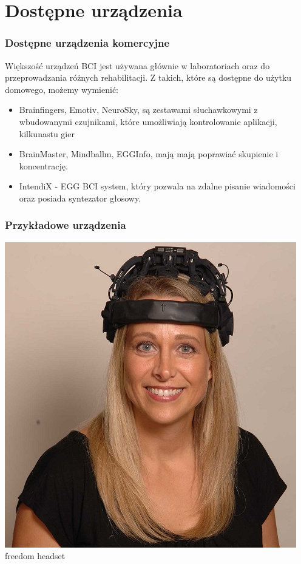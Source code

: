 \documentclass{beamer}
\begin{document}
\section{Dostępne urządzenia}

\begin{frame}
    \frametitle{Dostępne urządzenia komercyjne}
    Większość urządzeń BCI jest używana głównie w laboratoriach oraz do przeprowadzania różnych rehabilitacji.
    Z takich, które są dostępne do użytku domowego, możemy wymienić:
    \begin{itemize}
        \item Brainfingers, Emotiv, NeuroSky, są zestawami słuchawkowymi z wbudowanymi czujnikami, które umożliwiają
        kontrolowanie aplikacji, kilkunastu gier
        \item BrainMaster, Mindballm, EGGInfo, mają mają poprawiać skupienie i koncentrację. 
        \item IntendiX - EGG BCI system, który pozwala na zdalne pisanie wiadomości oraz posiada syntezator głosowy.
    \end{itemize}
\end{frame}


\begin{frame}
    \frametitle{Przykładowe urządzenia}
    \begin{center}
        \includegraphics[scale=0.5]{freedom.jpg}
        \\

        {\tiny freedom headset }
    \end{center}    
\end{frame}
\end{document}
